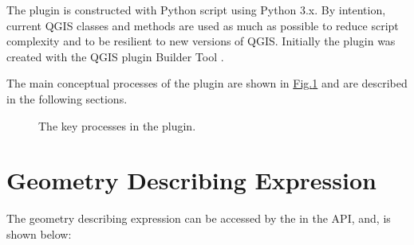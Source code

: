 \documentclass[a4paper,11pt,english]{sphinxmanual}
\begin{document}
The plugin is constructed with Python script using Python 3.x.  By intention, current QGIS classes and methods are used as much as possible to reduce script complexity and to be resilient to new versions of QGIS.  Initially the plugin was created with the QGIS plugin Builder Tool .

The main conceptual processes of the plugin are shown in \hyperref[\detokenize{pluginDesign:figureplugindesign}]{Fig.\@ \ref{\detokenize{pluginDesign:figureplugindesign}}} and are described in the following sections.

\begin{figure}[htbp]
\centering
\capstart

\noindent{}
\caption{The key processes in the  plugin.}\label{\detokenize{pluginDesign:id4}}\label{\detokenize{pluginDesign:figureplugindesign}}\end{figure}


\section{Geometry Describing Expression}
\label{\detokenize{pluginDesign:geometry-describing-expression}}
The geometry describing expression can be accessed by the {\hyperref[\detokenize{API:parseqgisgeometry-api}]{}} in the API, and, is shown below:
\end{document}
